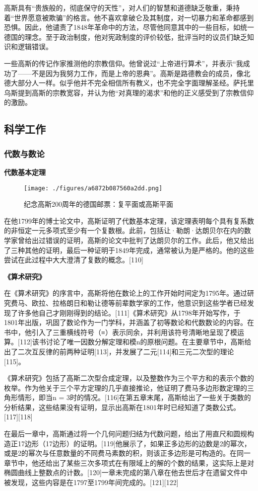 高斯具有“贵族般的，彻底保守的天性”，对人们的智慧和道德缺乏敬重，秉持着“世界愿意被欺骗”的格言。他不喜欢拿破仑及其制度，对一切暴力和革命都感到恐惧。因此，他谴责了1848年革命中的方法，尽管他同意其中的一些目标，如统一德国的理念。至于政治制度，他对宪政制度的评价较低，批评当时的议员们缺乏知识和逻辑错误。

一些高斯的传记作家推测他的宗教信仰。他曾说过“上帝进行算术”，并表示“我成功了——不是因为我努力工作，而是上帝的恩典”。高斯是路德教会的成员，像北德大部分人一样。似乎他并不完全相信所有教义，也不完全字面理解圣经。萨托里乌斯提到高斯的宗教宽容，并认为他“对真理的渴求”和他的正义感受到了宗教信仰的激励。
\subsection{科学工作}  
\subsubsection{代数与数论}  
\textbf{代数基本定理}
\begin{figure}[ht]
\centering
\texttt{[image: ./figures/a6872b087560a2dd.png]}
\caption{纪念高斯200周年的德国邮票：复平面或高斯平面} \label{fig_KRGS_13}
\end{figure}
在他1799年的博士论文中，高斯证明了代数基本定理，该定理表明每个具有复系数的非恒定一元多项式至少有一个复数根。此前，包括让·勒朗·达朗贝尔在内的数学家曾给出过错误的证明，高斯的论文中批判了达朗贝尔的工作。此后，他又给出了三种其他的证明，最后一种证明于1849年完成，通常被认为是严格的。他的这些尝试在此过程中大大澄清了复数的概念。[110]

\textbf{《算术研究》}

在《算术研究》的序言中，高斯将他在数论上的工作开始时间定为1795年。通过研究费马、欧拉、拉格朗日和勒让德等前辈数学家的工作，他意识到这些学者已经发现了许多他自己才刚刚得到的结论。[111]《算术研究》从1798年开始写作，于1801年出版，巩固了数论作为一门学科，并涵盖了初等数论和代数数论的内容。在书中，他引入了三重横线符号（≡）表示同余，并利用该符号清晰地呈现了模运算。[112]该书讨论了唯一因数分解定理和模n的原根问题。在主要章节中，高斯给出了二次互反律的前两种证明[113]，并发展了二元[114]和三元二次型的理论[115]。

《算术研究》包括了高斯二次型合成定理，以及整数作为三个平方和的表示个数的枚举。作为他关于三个平方定理的几乎直接推论，他证明了费马多边形数定理的三角形情形，即当n = 3时的情况。[116]在第五章末尾，高斯给出了一些关于类数的分析结果，这些结果没有证明，显示出高斯在1801年时已经知道了类数公式。[117][118]

在最后一章中，高斯通过将一个几何问题归结为代数问题，给出了用直尺和圆规构造正17边形（17边形）的证明。[119]他展示了，如果正多边形的边数是2的幂次，或是2的幂次与任意数量的不同费马素数的积，则该正多边形是可构造的。在同一章节中，他还给出了某些三次多项式在有限域上的解的个数的结果，这实际上是对椭圆曲线上整数点的计数。[120]一章未完成的第八章在他去世后才在遗留文件中被发现，这些内容是在1797至1799年间完成的。[121][122]

